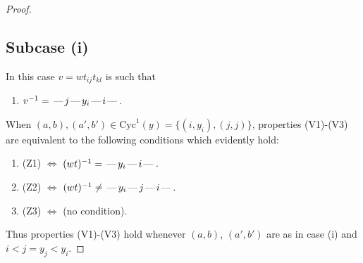 \documentclass[10pt]{article}
\theoremstyle{definition}
\theoremstyle{definition}
\def\dash{\text{\hspace{0.5mm}---\hspace{0.5mm}}}
\def\Cyc{\mathrm{Cyc}}
\begin{document}
\begin{proof}
\subsection{Subcase (i)}
In this case $v = wt_{ij}t_{kl}$ is such that
\begin{enumerate}\item[]$v^{-1} = \dash j\dash y_i\dash i\dash $.\end{enumerate}
When $(a,b),(a',b')\in\Cyc^1(y)= \{(i,y_i),(j,j)\}$,
properties (V1)-(V3) are equivalent to the following conditions which evidently hold:
\begin{enumerate}
\item[](Z1) $\Leftrightarrow$ $(wt)^{-1} = \dash y_i \dash i \dash$.
\item[](Z2) $\Leftrightarrow$ $(wt)^{-1} \neq \dash y_i \dash j \dash i \dash$.
\item[](Z3) $\Leftrightarrow$ (no condition).
\end{enumerate}
Thus properties (V1)-(V3) hold whenever
$(a,b)$, $(a',b')$ are as in case (i) and $i < j = y_j < y_i$.

\end{proof}
\end{document}
